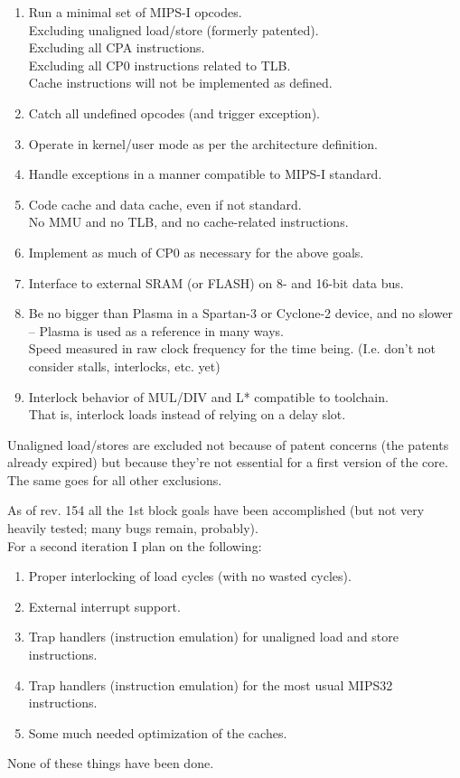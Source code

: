 \documentclass[11pt]{article}
\begin{document}
\begin{enumerate}
    \item Run a minimal set of MIPS-I opcodes.\\
        Excluding unaligned load/store (formerly patented).\\
        Excluding all CPA instructions.\\
        Excluding all CP0 instructions related to TLB.\\
        Cache instructions will not be implemented as defined.
    \item Catch all undefined opcodes (and trigger exception).
    \item Operate in kernel/user mode as per the architecture definition.
    \item Handle exceptions in a manner compatible to MIPS-I standard.
    \item Code cache and data cache, even if not standard.\\
        No MMU and no TLB, and no cache-related instructions.
    \item Implement as much of CP0 as necessary for the above goals.
    \item Interface to external SRAM (or FLASH) on 8- and 16-bit data bus.
    \item Be no bigger than Plasma in a Spartan-3 or Cyclone-2 device, and
        no slower -- Plasma is used as a reference in many ways.\\
        Speed measured in raw clock frequency for the time being.
        (I.e. don't not consider stalls, interlocks, etc. yet)
    \item Interlock behavior of MUL/DIV and L* compatible to toolchain.\\
        That is, interlock loads instead of relying on a delay slot.
\end{enumerate}


    Unaligned load/stores are excluded not because of patent concerns (the
    patents already expired) but because they're not essential for a first
    version of the core. The same goes for all other exclusions.

    As of rev. 154 all the 1st block goals have been accomplished (but not very
    heavily tested; many bugs remain, probably).\\
    
    For a second iteration I plan on the following:
\begin{enumerate}
    \item Proper interlocking of load cycles (with no wasted cycles).
    \item External interrupt support.
    \item Trap handlers (instruction emulation) for unaligned load and store 
        instructions.
    \item Trap handlers (instruction emulation) for the most usual MIPS32 
        instructions.
    \item Some much needed optimization of the caches.
\end{enumerate}
    None of these things have been done.\\
\end{document}
